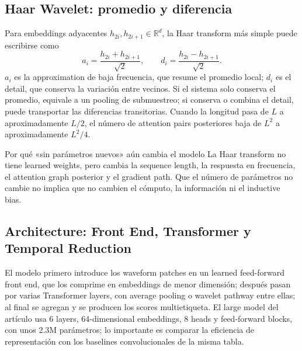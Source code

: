 \subsection{Haar Wavelet: promedio y diferencia}

Para embeddings adyacentes $h_{2i},h_{2i+1}\in\mathbb{R}^d$, la Haar transform más simple puede escribirse como
\[
a_i=\frac{h_{2i}+h_{2i+1}}{\sqrt{2}},
\qquad
d_i=\frac{h_{2i}-h_{2i+1}}{\sqrt{2}}.
\]
$a_i$ es la approximation de baja frecuencia, que resume el promedio local; $d_i$ es el detail, que conserva la variación entre vecinos. Si el sistema solo conserva el promedio, equivale a un pooling de submuestreo; si conserva o combina el detail, puede transportar las diferencias transitorias. Cuando la longitud pasa de $L$ a aproximadamente $L/2$, el número de attention pairs posteriores baja de $L^2$ a aproximadamente $L^2/4$.


\begin{importantbox}{Por qué «sin parámetros nuevos» aún cambia el modelo}
La Haar transform no tiene learned weights, pero cambia la sequence length, la respuesta en frecuencia, el attention graph posterior y el gradient path. Que el número de parámetros no cambie no implica que no cambien el cómputo, la información ni el inductive bias.
\end{importantbox}

\subsection{Architecture: Front End, Transformer y Temporal Reduction}

El modelo primero introduce los waveform patches en un learned feed-forward front end, que los comprime en embeddings de menor dimensión; después pasan por varias Transformer layers, con average pooling o wavelet pathway entre ellas; al final se agregan y se producen los scores multietiqueta. El large model del artículo usa 6 layers, 64-dimensional embeddings, 8 heads y feed-forward blocks, con unos 2.3M parámetros; lo importante es comparar la eficiencia de representación con los baselines convolucionales de la misma tabla.


